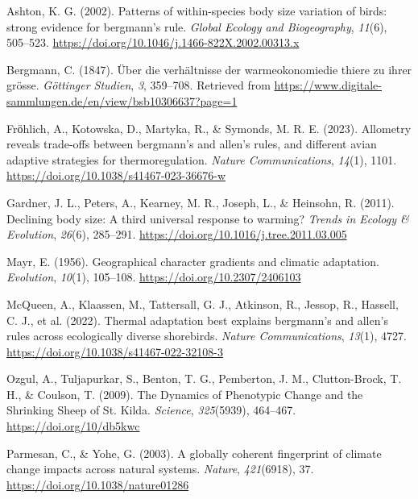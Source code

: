 \documentclass[
]{agujournal2019}
\newlength{\cslhangindent}
\newenvironment{CSLReferences}[2] %
 {\begin{list}{}{%
  \setlength{\itemindent}{0pt}
  \setlength{\leftmargin}{0pt}
  \setlength{\parsep}{0pt}
  \ifodd #1
   \setlength{\leftmargin}{\cslhangindent}
   \setlength{\itemindent}{-1\cslhangindent}
  \fi
  \setlength{\itemsep}{#2\baselineskip}}}
 {\end{list}}
\begin{document}
\label{refs}
\begin{CSLReferences}{1}{0}
\vspace{1em}

Ashton, K. G. (2002). Patterns of within-species body size variation of
birds: strong evidence for bergmann's rule. \emph{Global Ecology and
Biogeography}, \emph{11}(6), 505--523.
\url{https://doi.org/10.1046/j.1466-822X.2002.00313.x}

Bergmann, C. (1847). Über die verhältnisse der warmeokonomiedie thiere
zu ihrer grösse. \emph{Göttinger Studien}, \emph{3}, 359--708. Retrieved
from \url{https://www.digitale-sammlungen.de/en/view/bsb10306637?page=1}

Frӧhlich, A., Kotowska, D., Martyka, R., \& Symonds, M. R. E. (2023).
Allometry reveals trade-offs between bergmann{'}s and allen{'}s rules,
and different avian adaptive strategies for thermoregulation.
\emph{Nature Communications}, \emph{14}(1), 1101.
\url{https://doi.org/10.1038/s41467-023-36676-w}

Gardner, J. L., Peters, A., Kearney, M. R., Joseph, L., \& Heinsohn, R.
(2011). Declining body size: A third universal response to warming?
\emph{Trends in Ecology \& Evolution}, \emph{26}(6), 285--291.
\url{https://doi.org/10.1016/j.tree.2011.03.005}

Mayr, E. (1956). Geographical character gradients and climatic
adaptation. \emph{Evolution}, \emph{10}(1), 105--108.
\url{https://doi.org/10.2307/2406103}

McQueen, A., Klaassen, M., Tattersall, G. J., Atkinson, R., Jessop, R.,
Hassell, C. J., et al. (2022). Thermal adaptation best explains
bergmann{'}s and allen{'}s rules across ecologically diverse shorebirds.
\emph{Nature Communications}, \emph{13}(1), 4727.
\url{https://doi.org/10.1038/s41467-022-32108-3}

Ozgul, A., Tuljapurkar, S., Benton, T. G., Pemberton, J. M.,
Clutton-Brock, T. H., \& Coulson, T. (2009). The Dynamics of Phenotypic
Change and the Shrinking Sheep of St. Kilda. \emph{Science},
\emph{325}(5939), 464--467. \url{https://doi.org/10/db5kwc}

Parmesan, C., \& Yohe, G. (2003). A globally coherent fingerprint of
climate change impacts across natural systems. \emph{Nature},
\emph{421}(6918), 37. \url{https://doi.org/10.1038/nature01286}


\end{CSLReferences}
\end{document}
